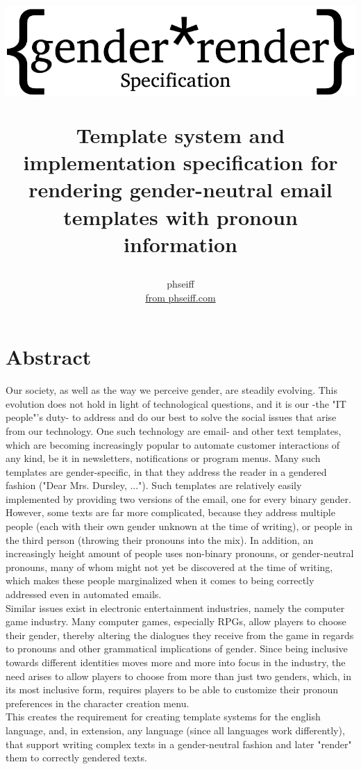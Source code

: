 \documentclass{article}
\author{phseiff\\ \href{https://phseiff.com}{from phseiff.com}\\ {\href{https://phseiff.com/gender-render/\#download-specifications}{\version}}}
\title{\begin{center}
           \includegraphics{images/title-black.pdf}
\end{center} Template system and implementation specification for rendering gender-neutral email templates with pronoun information}
\begin{document}
\maketitle
\pagebreak
\tableofcontents
\pagebreak

\section{Abstract}

    Our society, as well as the way we perceive gender, are steadily evolving.
    This evolution does not hold in light of technological questions, and it is our -the "IT people"'s duty- to address and do our best to solve the social issues that arise from our technology.
    One such technology are email- and other text templates, which are becoming increasingly popular to automate customer interactions of any kind, be it in newsletters, notifications or program menus.
    Many such templates are gender-specific, in that they address the reader in a gendered fashion ("Dear Mrs. Dursley, ...").
    Such templates are relatively easily implemented by providing two versions of the email, one for every binary gender.
    However, some texts are far more complicated, because they address multiple people (each with their own gender unknown at the time of writing), or people in the third person (throwing their pronouns into the mix).
    In addition, an increasingly height amount of people uses non-binary pronouns, or gender-neutral pronouns, many of whom might not yet be discovered at the time of writing, which makes these people marginalized when it comes to being correctly addressed even in automated emails.\\

    Similar issues exist in electronic entertainment industries, namely the computer game industry.
    Many computer games, especially RPGs, allow players to choose their gender, thereby altering the dialogues they receive from the game in regards to pronouns and other grammatical implications of gender.
    Since being inclusive towards different identities moves more and more into focus in the industry, the need arises to allow players to choose from more than just two genders, which, in its most inclusive form, requires players to be able to customize their pronoun preferences in the character creation menu.\\

    This creates the requirement for creating template systems for the english language, and, in extension, any language (since all languages work differently), that support writing complex texts in a gender-neutral fashion and later "render" them to correctly gendered texts.\\
\end{document}

